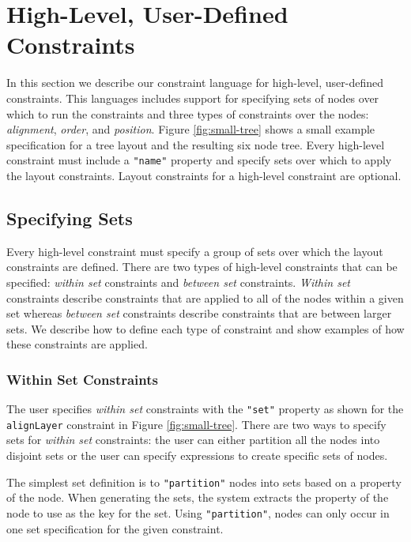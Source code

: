 \section{High-Level, User-Defined Constraints}
\smallTree
In this section we describe our constraint language for high-level, user-defined constraints. This languages includes support for specifying sets of nodes over which to run the constraints and three types of constraints over the nodes: \emph{alignment}, \emph{order}, and \emph{position}. Figure \ref{fig:small-tree} shows a small example specification for a tree layout and the resulting six node tree. Every high-level constraint must include a \texttt{"name"} property and specify sets over which to apply the layout constraints. Layout constraints for a high-level constraint are optional.

\subsection{Specifying Sets}
\label{sec:sets}
Every high-level constraint must specify a group of sets over which the layout constraints are defined. There are two types of high-level constraints that can be specified: \emph{within set} constraints and \emph{between set} constraints. \emph{Within set} constraints describe constraints that are applied to all of the nodes within a given set whereas \emph{between set} constraints describe constraints that are between larger sets. We describe how to define each type of constraint and show examples of how these constraints are applied.

\subsubsection{Within Set Constraints}
The user specifies \emph{within set} constraints with the \texttt{"set"} property as shown for the \texttt{alignLayer} constraint in Figure \ref{fig:small-tree}. There are two ways to specify sets for \emph{within set} constraints: the user can either partition all the nodes into disjoint sets or the user can specify expressions to create specific sets of nodes.

The simplest set definition is to \texttt{"partition"} nodes into sets based on a property of the node. When generating the sets, the system extracts the property of the node to use as the key for the set. Using \texttt{"partition"}, nodes can only occur in one set specification for the given constraint.

